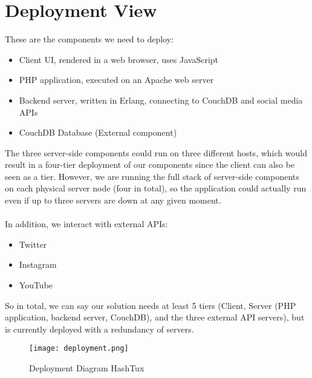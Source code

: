 \chapter{Deployment View}
These are the components we need to deploy:
\begin{itemize}
  \item Client UI, rendered in a web browser, uses JavaScript
  \item PHP application, executed on an Apache web server
  \item Backend server, written in Erlang, connecting to CouchDB and social
     media APIs
  \item CouchDB Database (External component)
\end{itemize}
The three server-side components could run on three different hosts, which would
result in a four-tier deployment of our components since the client can also be
seen as a tier. \newline
However, we are running the full stack of server-side components on each
physical server node (four in total), so the application could actually run even
if up to three servers are down at any given moment. \\ \\
In addition, we interact with external APIs:
\begin{itemize}
  \item Twitter
  \item Instagram
  \item YouTube
\end{itemize}
So in total, we can say our solution needs at least 5 tiers (Client, Server
(PHP application, backend server, CouchDB), and the three external API servers),
but is currently deployed with a redundancy of servers.
\newpage
\begin{figure}[ht]
  \centering
  \texttt{[image: deployment.png]}
  \caption{Deployment Diagram HashTux}
\end{figure}